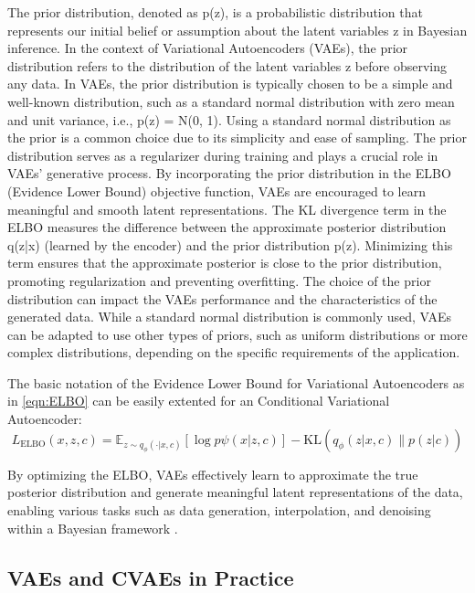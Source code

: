 The prior distribution, denoted as p(z), is a probabilistic distribution that represents our initial belief or assumption about the latent variables z in Bayesian inference. In the context of Variational Autoencoders (VAEs), the prior distribution refers to the distribution of the latent variables z before observing any data.
In VAEs, the prior distribution is typically chosen to be a simple and well-known distribution, such as a standard normal distribution with zero mean and unit variance, i.e., p(z) = N(0, 1). Using a standard normal distribution as the prior is a common choice due to its simplicity and ease of sampling.
The prior distribution serves as a regularizer during training and plays a crucial role in VAEs' generative process. By incorporating the prior distribution in the ELBO (Evidence Lower Bound) objective function, VAEs are encouraged to learn meaningful and smooth latent representations. The KL divergence term in the ELBO measures the difference between the approximate posterior distribution q(z|x) (learned by the encoder) and the prior distribution p(z). Minimizing this term ensures that the approximate posterior is close to the prior distribution, promoting regularization and preventing overfitting.
The choice of the prior distribution can impact the VAEs performance and the characteristics of the generated data. While a standard normal distribution is commonly used, VAEs can be adapted to use other types of priors, such as uniform distributions or more complex distributions, depending on the specific requirements of the application.
\fi

The basic notation of the Evidence Lower Bound for Variational Autoencoders as in \eqref{eqn:ELBO} can be easily extented for an Conditional Variational Autoencoder:
\begin{equation}\label{eqn:ELBO-CVAE}
	L_\text{ELBO}(x, z, c) = \mathbb{E}_{z\sim q_\phi(\cdot|x, c)} \left[ \log p\psi(x|z, c) \right] - \text{KL}\left( q_\phi(z|x, c) \| p(z|c) \right)
\end{equation}

By optimizing the ELBO, VAEs effectively learn to approximate the true posterior distribution and generate meaningful latent representations of the data, enabling various tasks such as data generation, interpolation, and denoising within a Bayesian framework \cite{pml2Book}.

\subsection{VAEs and CVAEs in Practice}

